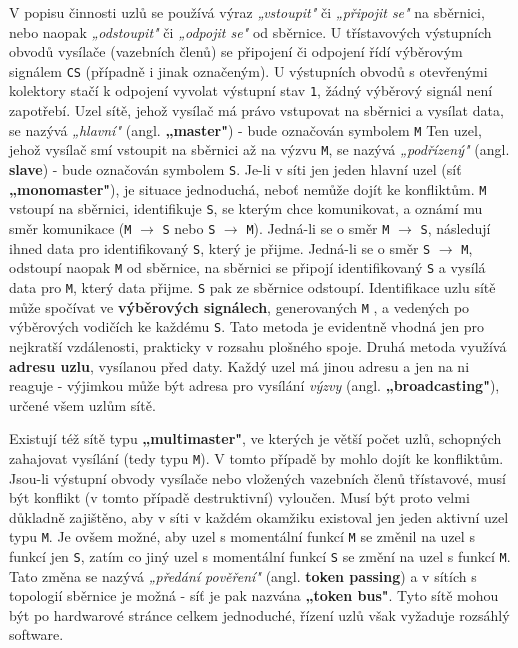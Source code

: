        V popisu činnosti uzlů se používá výraz \emph{„vstoupit"} či \emph{„připojit se"} na
        sběrnici, nebo naopak \emph{„odstoupit"} či \emph{„odpojit se"} od sběrnice. U třístavových
        výstupních obvodů vysílače (vazebních členů) se připojení či odpojení řídí výběrovým
        signálem \texttt{CS} (případně i jinak označeným). U výstupních obvodů s otevřenými
        kolektory stačí k odpojení vyvolat výstupní stav \texttt{1}, žádný výběrový signál není
        zapotřebí. Uzel sítě, jehož vysílač má právo vstupovat na sběrnici a vysílat data, se nazývá
        \emph{„hlavní"} (angl. \textbf{„master"}) - bude označován symbolem \texttt{M} Ten uzel,
        jehož vysílač smí vstoupit na sběrnici až na výzvu \texttt{M}, se nazývá \emph{„podřízený"}
        (angl. \textbf{slave}) - bude označován symbolem \texttt{S}. Je-li v síti jen jeden hlavní
        uzel (síť \textbf{„monomaster"}), je situace jednoduchá, neboť nemůže dojít ke konfliktům.
        \texttt{M} vstoupí na sběrnici, identifikuje \texttt{S}, se kterým chce komunikovat, a
        oznámí mu směr komunikace (\texttt{M} \(\rightarrow\) \texttt{S} nebo \texttt{S}
        \(\rightarrow\) \texttt{M}). Jedná-li se o směr \texttt{M} \(\rightarrow\) \texttt{S},
        následují ihned data pro  identifikovaný \texttt{S}, který je přijme. Jedná-li se o směr
        \texttt{S} \(\rightarrow\) \texttt{M}, odstoupí naopak \texttt{M} od sběrnice, na sběrnici
        se připojí identifikovaný \texttt{S} a vysílá data pro \texttt{M}, který data přijme.
        \texttt{S} pak ze sběrnice odstoupí. Identifikace uzlu sítě může spočívat ve
        \textbf{výběrových signálech}, generovaných \texttt{M} , a vedených po výběrových vodičích
        ke každému \texttt{S}. Tato metoda je evidentně vhodná jen pro nejkratší vzdálenosti,
        prakticky v rozsahu plošného spoje. Druhá metoda využívá \textbf{adresu uzlu}, vysílanou
        před daty. Každý uzel má jinou adresu a jen na ni reaguje - výjimkou může být adresa pro
        vysílání \emph{výzvy} (angl. \textbf{„broadcasting"}), určené všem uzlům sítě.
        
        Existují též sítě typu \textbf{„multimaster"}, ve kterých je větší počet uzlů, schopných
        zahajovat vysílání (tedy typu \texttt{M}). V tomto případě by mohlo dojít ke konfliktům.
        Jsou-li výstupní obvody vysílače nebo vložených vazebních členů třístavové, musí být
        konflikt (v tomto případě destruktivní) vyloučen. Musí být proto velmi důkladně zajištěno,
        aby v síti v každém okamžiku  existoval jen jeden aktivní uzel typu \texttt{M}. Je ovšem
        možné, aby uzel s momentální funkcí \texttt{M} se změnil na uzel s funkcí jen \texttt{S},
        zatím co jiný uzel s momentální funkcí \texttt{S} se změní na uzel s funkcí \texttt{M}. Tato
        změna se nazývá \emph{„předání pověření"} (angl. \textbf{token passing}) a v sítích s
        topologií sběrnice je možná - síť je pak nazvána \textbf{„token bus"}. Tyto sítě mohou být
        po hardwarové stránce celkem jednoduché, řízení uzlů však vyžaduje rozsáhlý software.
        
